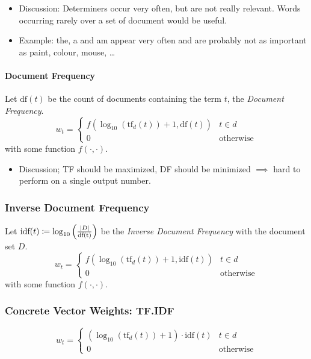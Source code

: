 				\begin{itemize}
					\item Discussion: Determiners occur very often, but are not really relevant. Words occurring rarely over a set of document would be useful.
					\item Example: the, a and am appear very often and are probably not as important as paint, colour, mouse, \dots
				\end{itemize}

			\paragraph{Document Frequency} %
				Let \( \text{df}(t) \) be the count of documents containing the term \(t\), the \textit{Document Frequency}.
				\begin{equation*}
					w_t =
					\begin{cases}
						f(\log_{10}(\text{tf}_d(t)) + 1, \text{df}(t)) & t \in d          \\
						0                                              & \text{otherwise}
					\end{cases}
				\end{equation*}
				with some function \( f(\cdot, \cdot) \).

				\begin{itemize}
					\item Discussion; TF should be maximized, DF should be minimized \(\implies\) hard to perform on a single output number.
				\end{itemize}

			\subsubsection{Inverse Document Frequency} %
				Let \( \text{idf}(t) \coloneqq \log_{10}\Big(\frac{\abs{D}}{\text{df(t)}}\Big) \) be the \textit{Inverse Document Frequency} with the document set \(D\).
				\begin{equation*}
					w_t =
					\begin{cases}
						f(\log_{10}(\text{tf}_d(t)) + 1, \text{idf}(t)) & t \in d          \\
						0                                               & \text{otherwise}
					\end{cases}
				\end{equation*}
				with some function \( f(\cdot, \cdot) \).

			\subsubsection{Concrete Vector Weights: TF.IDF} %
				\begin{equation*}
					w_t =
					\begin{cases}
						(\log_{10}(\text{tf}_d(t)) + 1) \cdot \text{idf}(t) & t \in d          \\
						0                                                   & \text{otherwise}
					\end{cases}
				\end{equation*}

